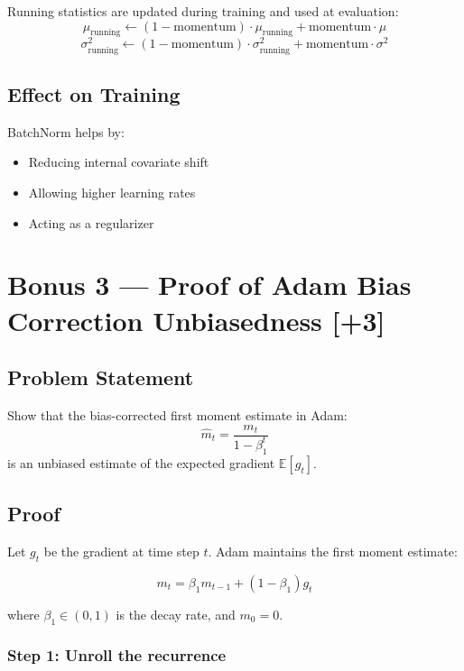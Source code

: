 \documentclass[11pt,a4paper]{article}
\begin{document}
Running statistics are updated during training and used at evaluation:
\[
\mu_{\text{running}} \leftarrow (1 - \text{momentum}) \cdot \mu_{\text{running}} + \text{momentum} \cdot \mu
\]
\[
\sigma^2_{\text{running}} \leftarrow (1 - \text{momentum}) \cdot \sigma^2_{\text{running}} + \text{momentum} \cdot \sigma^2
\]

\subsection*{Effect on Training}

BatchNorm helps by:
\begin{itemize}
    \item Reducing internal covariate shift
    \item Allowing higher learning rates
    \item Acting as a regularizer
\end{itemize}


\section*{Bonus 3 --- Proof of Adam Bias Correction Unbiasedness [+3]}

\subsection*{Problem Statement}

Show that the bias-corrected first moment estimate in Adam:
\[
\hat{m}_t = \frac{m_t}{1-\beta_1^t}
\]
is an unbiased estimate of the expected gradient $\mathbb{E}[g_t]$.

\subsection*{Proof}

Let $g_t$ be the gradient at time step $t$. Adam maintains the first moment estimate:

\[
m_t = \beta_1 m_{t-1} + (1-\beta_1)g_t
\]

where $\beta_1 \in (0, 1)$ is the decay rate, and $m_0 = 0$.

\subsubsection*{Step 1: Unroll the recurrence}
\end{document}
